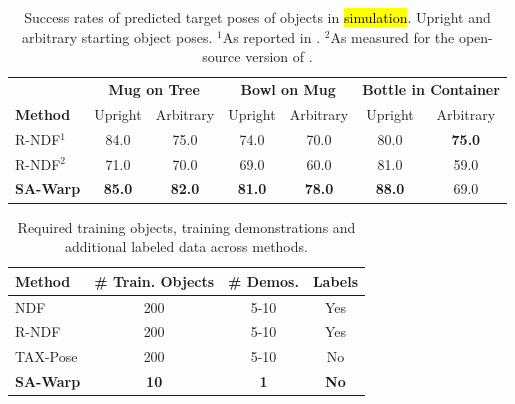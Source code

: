\documentclass{article}
\begin{document}
\begin{table}[h]
    \centering
    \begin{tabular}{lcccccc}
        \toprule
          & \multicolumn{2}{c}{\textbf{Mug on Tree}} & \multicolumn{2}{c}{\textbf{Bowl on Mug}} & \multicolumn{2}{c}{\textbf{Bottle in Container}} \\
         \textbf{Method} & Upright & Arbitrary & Upright & Arbitrary & Upright & Arbitrary \\
         \midrule
         R-NDF$^1$ & 84.0 & 75.0 & 74.0 & 70.0 & 80.0 & \textbf{75.0} \\
         R-NDF$^2$ & 71.0 & 70.0 & 69.0 & 60.0 & 81.0 & 59.0 \\
         \textbf{SA-Warp} & \textbf{85.0} & \textbf{82.0} & \textbf{81.0} & \textbf{78.0} & \textbf{88.0} & 69.0 \\
         \bottomrule
    \end{tabular}
    \caption{Success rates of predicted target poses of objects in \hl{simulation}. Upright and arbitrary starting object poses. $^1$As reported in \citet{simeonov22Neurala}. $^2$As measured for the open-source version of \citet{simeonov22Neurala}.}
\end{table}
\begin{table}[h]
    \centering
    \begin{tabular}{lccc}
        \toprule
         \textbf{Method} & \# Train. Objects & \# Demos. & Labels \\
         \midrule
         NDF & 200 & 5-10 & Yes \\
         R-NDF & 200 & 5-10 & Yes \\
         TAX-Pose & 200 & 5-10 & No \\
         \textbf{SA-Warp} & \textbf{10} & \textbf{1} & \textbf{No} \\
         \bottomrule
    \end{tabular}
    \caption{Required training objects, training demonstrations and additional labeled data across methods.}
    \label{tab:training}
\end{table}
\end{document}
